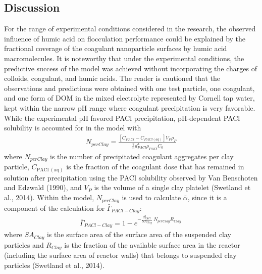 \documentclass[letterpaper,10pt,english]{sphinxmanual}
\begin{document}
\subsection{Discussion}
\label{\detokenize{Flocculation/Floc_Model:id31}}
For the range of experimental conditions considered in the research, the observed influence of humic acid on flocculation performance could be explained by the fractional coverage of the coagulant nanoparticle surfaces by humic acid macromolecules. It is noteworthy that under the experimental conditions, the predictive success of the model was achieved without incorporating the charges of colloids, coagulant, and humic acids. The reader is cautioned that the observations and predictions were obtained with one test particle, one coagulant, and one form of DOM in the mixed electrolyte represented by Cornell tap water, kept within the narrow pH range where coagulant precipitation is very favorable. While the experimental pH favored PACl precipitation, pH-dependent PACl solubility is accounted for in the model with
\begin{equation}\label{equation:Flocculation/Floc_Model:Flocculation/Floc_Model:23}
\begin{split}N_{perClay}=\frac{\left[C_{PACl}-C_{PACl\left(aq\right)}\right]V_{P}{\rho }_{P}}{\frac{\pi }{6}d^{3}_{PACl}{\rho }_{PACl}C_0}\end{split}
\end{equation}
where \(N_{perClay}\) is the number of precipitated coagulant aggregates per clay particle, \(C_{\mathrm{PACl\ (aq)}}\) is the fraction of the coagulant dose that has remained in solution after precipitation using the PACl solubility observed by Van Benschoten and Edzwald (1990), and \(V_{P}\) is the volume of a single clay platelet (Swetland et al., 2014). Within the model, \(N_{perClay}\) is used to calculate \(\bar{\alpha }\), since it is a component of the calculation for \({\bar{\Gamma}}_{PACl-Clay}\):
\begin{equation}\label{equation:Flocculation/Floc_Model:Flocculation/Floc_Model:24}
\begin{split}{\bar{\Gamma}}_{PACl-Clay}=1-e^{-\frac{d^{2}_{PACl}}{{SA}_{Clay}}\ N_{perClay}R_{Clay}\ }\end{split}
\end{equation}
where \({SA}_{Clay}\) is the surface area of the surface area of the suspended clay particles and \(R_{Clay}\) is the fraction of the available surface area in the reactor (including the surface area of reactor walls) that belongs to suspended clay particles (Swetland et al., 2014).
\end{document}
